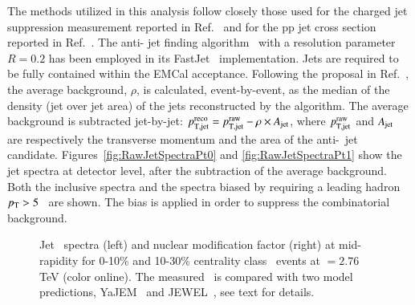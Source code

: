 \documentclass[3p,times]{simplearticle}
\begin{document}
The methods utilized in this analysis follow closely those used for the charged jet suppression measurement reported in Ref.~\cite{ALICE:2014a} 
and for the pp jet cross section reported in Ref.~\cite{ALICE:2013c}.
The anti-\kt{} jet finding algorithm~\cite{Cacciari:2008c} with a resolution parameter $R=0.2$ has been employed in 
its FastJet~\cite{Cacciari:2012} implementation. Jets are required to be fully contained within the EMCal acceptance.
Following the proposal in Ref.~\cite{Cacciari:2008b}, the average background, $\rho$, is calculated, event-by-event, as the median of the \pT{}
density (jet \pT{} over jet area) of the jets reconstructed by the \kt{} algorithm.
The average background is subtracted jet-by-jet: $p_{\rm T,jet}^{\rm reco}=p_{\rm T,jet}^{\rm raw}-\rho \times A_{\rm jet}$,
where $p_{\rm T,jet}^{\rm raw}$ and $A_{\rm jet}$ are respectively the transverse momentum and the area of the anti-\kt\ jet candidate. 
Figures~\ref{fig:RawJetSpectraPt0} and \ref{fig:RawJetSpectraPt1} show the jet \pT{} spectra at detector level, 
after the subtraction of the average background.
Both the inclusive spectra and the spectra biased by requiring a leading hadron $p_{\mathrm{T}}>5$ \GeVc\ are shown.
The bias is applied in order to suppress the combinatorial background.
%
\begin{figure}[tb]
\centering
{} \quad
{} 
\caption{Jet \pT\ spectra (left) and nuclear modification factor (right) at mid-rapidity for 0-10\% and 10-30\% centrality class \PbPb\ events 
at \snn$=2.76$ TeV (color online). The measured \RAA\ is compared with two model predictions, YaJEM~\cite{Renk:2013} 
and JEWEL~\cite{Zapp:2014}, see text for details.}
\label{fig:SpectraRaa}
\end{figure}
\end{document}
